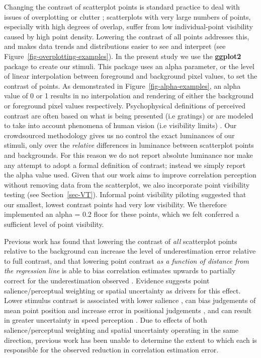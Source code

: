 \documentclass[manuscript, anonymous, screen]{acmart}
\begin{document}
Changing the contrast of scatterplot points is standard practice to deal
with issues of overplotting or clutter
\citep{matejka_2015, bertini_2004}; scatterplots with very large numbers
of points, especially with high degrees of overlap, suffer from low
individual-point visibility caused by high point density. Lowering the
contrast of all points addresses this, and makes data trends and
distributions easier to see and interpret (see
Figure~\ref{fig-overplotting-examples}). In the present study we use the
\textbf{ggplot2} package \citep{hadley_gg2016} to create our stimuli.
This package uses an alpha parameter, or the level of linear
interpolation \citep{stone_2008} between foreground and background pixel
values, to set the contrast of points. As demonstrated in
Figure~\ref{fig-alpha-examples}, an alpha value of 0 or 1 results in no
interpolation and rendering of either the background or foreground pixel
values respectively. Psychophysical definitions of perceived contrast
are often based on what is being presented (i.e gratings) or are modeled
to take into account phenomena of human vision (i.e visibility limits)
\citep{zuffi_2007}. Our crowdsourced methodology gives us no control the
exact luminances of our stimuli, only over the \emph{relative}
differences in luminance between scatterplot points and backgrounds. For
this reason we do not report absolute luminance nor make any attempt to
adopt a formal definition of contrast; instead we simply report the
alpha value used. Given that our work aims to improve correlation
perception without removing data from the scatterplot, we also
incorporate point visibility testing (see Section~\ref{sec-VT}).
Informal point visibility piloting suggested that our smallest, lowest
contrast points had very low visibility. We therefore implemented an
alpha = 0.2 floor for these points, which we felt conferred a sufficient
level of point visibility.

Previous work has found that lowering the contrast of \emph{all}
scatterplot points relative to the background can increase the level of
underestimation error relative to full contrast, and that lowering point
contrast \emph{as a function of distance from the regression line} is
able to bias correlation estimates upwards to partially correct for the
underestimation observed \citep{strain_2023}. Evidence suggests point
salience/perceptual weighting or spatial uncertainty as drivers for this
effect. Lower stimulus contrast is associated with lower salience
\citep{healey_2011}, can bias judgements of mean point position
\citep{hong_2021} and increase error in positional judgements
\citep{wehrhahn_1990}, and can result in greater uncertainty in speed
perception \citep{champion_2017}. Due to effects of both
salience/perceptual weighting and spatial uncertainty operating in the
same direction, previous work \citep{strain_2023} has been unable to
determine the extent to which each is responsible for the observed
reduction in correlation estimation error.
\end{document}
